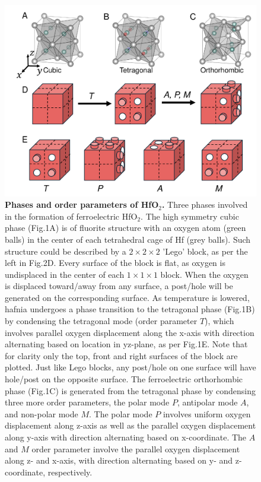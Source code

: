 \documentclass[12pt]{article}
\begin{document}
\begin{figure}
\begin{center}
  \includegraphics[scale=0.45]{Figure1.pdf}
  \caption{\textbf{Phases and order parameters of HfO$_2$.} Three phases involved in the formation of ferroelectric HfO$_2$. The high symmetry cubic phase (Fig.1A) is of fluorite structure with an oxygen atom (green balls) in the center of each tetrahedral cage of Hf (grey balls). Such structure could be described by a $2\times2\times2$ 'Lego' block, as per the left in Fig.2D. Every surface of the block is flat, as oxygen is undisplaced in the center of each $1\times1\times1$ block. When the oxygen is displaced toward/away from any surface, a post/hole will be generated on the corresponding surface. As temperature is lowered, hafnia undergoes a phase transition to the tetragonal phase (Fig.1B) by condensing the tetragonal mode (order parameter $T$), which involves parallel oxygen displacement along the x-axis with direction alternating based on location in yz-plane, as per Fig.1E. Note that for clarity only the top, front and right surfaces of the block are plotted. Just like Lego blocks, any post/hole on one surface will have hole/post on the opposite surface. The ferroelectric orthorhombic phase (Fig.1C) is generated from the tetragonal phase by condensing three more order parameters, the polar mode $P$, antipolar mode $A$, and non-polar mode $M$. The polar mode $P$ involves uniform oxygen displacement along z-axis as well as the parallel oxygen displacement along y-axis with direction alternating based on x-coordinate. The $A$ and $M$ order parameter involve the parallel oxygen displacement along z- and x-axis, with direction alternating based on y- and z-coordinate, respectively.}
  \label{figure1}
\end{center}
\end{figure}
\end{document}
